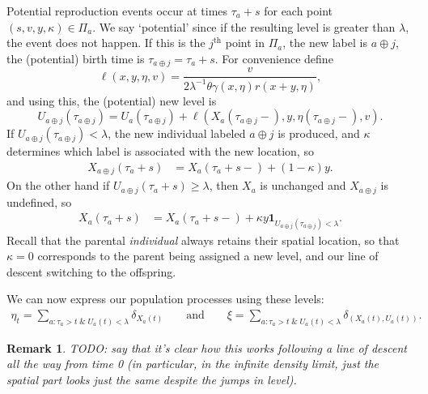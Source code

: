 \documentclass[12pt]{article}
\newtheorem{remark}[theorem]{Remark}
\newcommand{\ind}{\mathbf{1}}
\newcommand{\lp}{\xi}              %
\newcommand{\concat}{\oplus}   %
\newcommand{\comment}[1]{{\color{blue} \it #1}}
\begin{document}
Potential reproduction events occur at times $\tau_a + s$
for each point $(s, v, y, \kappa) \in \Pi_a$.
We say `potential' since if the resulting level is greater than $\lambda$,
the event does not happen.
If this is the $j^\text{th}$ point in $\Pi_a$,
the new label is $a \concat j$, the (potential) birth time is $\tau_{a \concat j} = \tau_a + s$.
For convenience define
$$
    \ell(x, y, \eta, v)
    =
    \frac{
        v
    }{
        2 \lambda^{-1} \theta \gamma(x, \eta) r(x + y, \eta)
    } ,
$$
and using this, the (potential) new level is
\begin{equation*}
    U_{a \concat j}(\tau_{a \concat j})
    =
    U_a(\tau_{a \concat j})
    +
    \ell(X_a(\tau_{a \concat j}-), y, \eta(\tau_{a \concat j}-), v) .
\end{equation*}
If $U_{a \concat j}(\tau_{a \concat j}) < \lambda$,
the new individual labeled $a \concat j$ is produced,
and $\kappa$ determines which label is associated with the new location,
so
\begin{align*}
    X_{a \concat j}(\tau_a + s)
    &=
    X_a(\tau_a+s-) + (1 - \kappa) y .
\end{align*}
On the other hand
if $U_{a \concat j}(\tau_a+s) \ge \lambda$, then $X_a$ is unchanged and $X_{a \concat j}$ is undefined,
so
\begin{align} \label{eqn:X_line_of_descent}
    X_a(\tau_a+s)
    &=
    X_a(\tau_a+s-) + \kappa y \ind_{U_{a \concat j}(\tau_{a \concat j}) < \lambda} .
\end{align}
Recall that the parental \emph{individual} always retains their spatial location,
so that $\kappa = 0$ corresponds to the parent being assigned a new level,
and our line of descent switching to the offspring.

We can now express our population processes using these levels:
\begin{align*}
    \eta_t = \sum_{a : \tau_a > t \;\&\; U_a(t) < \lambda} \delta_{X_a(t)}
    \qquad \text{and} \qquad
    \lp = \sum_{a : \tau_a > t \;\&\; U_a(t) < \lambda} \delta_{(X_a(t), U_a(t))} .
\end{align*}

\begin{remark}
    \comment{TODO: say that it's clear how this works following a line of descent
    all the way from time 0 (in particular, in the infinite density limit,
    just the spatial part looks just the same despite the jumps in level).}
\end{remark}

\end{document}
